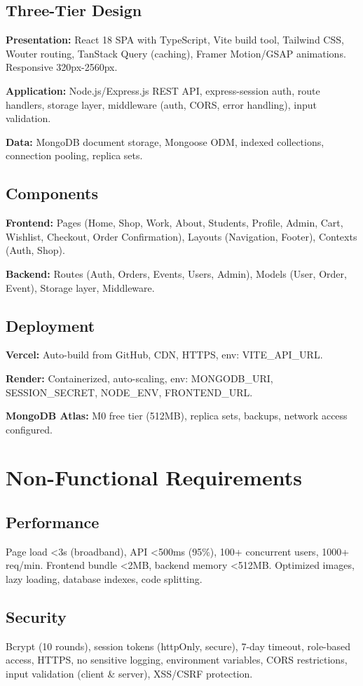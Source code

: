 ﻿\documentclass[11pt]{article}
\begin{document}
\subsection{Three-Tier Design}
\textbf{Presentation:} React 18 SPA with TypeScript, Vite build tool, Tailwind CSS, Wouter routing, TanStack Query (caching), Framer Motion/GSAP animations. Responsive 320px-2560px.

\textbf{Application:} Node.js/Express.js REST API, express-session auth, route handlers, storage layer, middleware (auth, CORS, error handling), input validation.

\textbf{Data:} MongoDB document storage, Mongoose ODM, indexed collections, connection pooling, replica sets.

\subsection{Components}
\textbf{Frontend:} Pages (Home, Shop, Work, About, Students, Profile, Admin, Cart, Wishlist, Checkout, Order Confirmation), Layouts (Navigation, Footer), Contexts (Auth, Shop).

\textbf{Backend:} Routes (Auth, Orders, Events, Users, Admin), Models (User, Order, Event), Storage layer, Middleware.

\subsection{Deployment}
\textbf{Vercel:} Auto-build from GitHub, CDN, HTTPS, env: VITE\_API\_URL.

\textbf{Render:} Containerized, auto-scaling, env: MONGODB\_URI, SESSION\_SECRET, NODE\_ENV, FRONTEND\_URL.

\textbf{MongoDB Atlas:} M0 free tier (512MB), replica sets, backups, network access configured.

\section{Non-Functional Requirements}

\subsection{Performance}
Page load <3s (broadband), API <500ms (95\%), 100+ concurrent users, 1000+ req/min. Frontend bundle <2MB, backend memory <512MB. Optimized images, lazy loading, database indexes, code splitting.

\subsection{Security}
Bcrypt (10 rounds), session tokens (httpOnly, secure), 7-day timeout, role-based access, HTTPS, no sensitive logging, environment variables, CORS restrictions, input validation (client \& server), XSS/CSRF protection.
\end{document}
